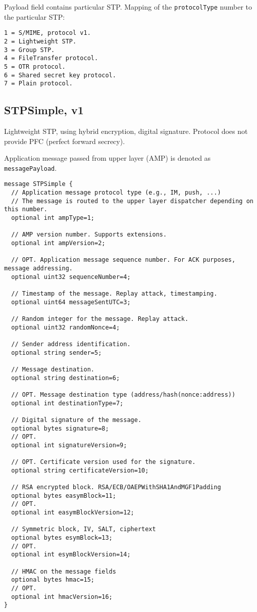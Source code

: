 \documentclass[a4paper,10pt]{article}
\begin{document}
Payload field contains particular STP. Mapping of the \verb#protocolType# number to the particular STP:\\
\begin{Verbatim}[frame=single]
1 = S/MIME, protocol v1.
2 = Lightweight STP.
3 = Group STP.
4 = FileTransfer protocol.
5 = OTR protocol.
6 = Shared secret key protocol.
7 = Plain protocol.
\end{Verbatim} 

\subsection{STPSimple, v1}
Lightweight STP, using hybrid encryption, digital signature. Protocol does not provide PFC (perfect forward secrecy).

Application message passed from upper layer (AMP) is denoted as \verb#messagePayload#. 
\begin{Verbatim}[frame=single]
message STPSimple {
  // Application message protocol type (e.g., IM, push, ...)
  // The message is routed to the upper layer dispatcher depending on this number.
  optional int ampType=1;
  
  // AMP version number. Supports extensions.
  optional int ampVersion=2;
  
  // OPT. Application message sequence number. For ACK purposes, message addressing.
  optional uint32 sequenceNumber=4;
  
  // Timestamp of the message. Replay attack, timestamping.
  optional uint64 messageSentUTC=3;
  
  // Random integer for the message. Replay attack.
  optional uint32 randomNonce=4;
  
  // Sender address identification.
  optional string sender=5;
  
  // Message destination.
  optional string destination=6;
  
  // OPT. Message destination type (address/hash(nonce:address))
  optional int destinationType=7;
  
  // Digital signature of the message.
  optional bytes signature=8;
  // OPT.
  optional int signatureVersion=9;
  
  // OPT. Certificate version used for the signature.
  optional string certificateVersion=10;
  
  // RSA encrypted block. RSA/ECB/OAEPWithSHA1AndMGF1Padding
  optional bytes easymBlock=11;
  // OPT.
  optional int easymBlockVersion=12;
  
  // Symmetric block, IV, SALT, ciphertext
  optional bytes esymBlock=13;
  // OPT.
  optional int esymBlockVersion=14;
  
  // HMAC on the message fields
  optional bytes hmac=15;
  // OPT.
  optional int hmacVersion=16;
}
\end{Verbatim} 
\end{document}
